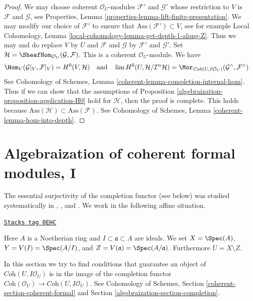 \begin{proof}

We may choose coherent $\mathcal{O}_U$-modules
$\mathcal{F}'$ and $\mathcal{G}'$ whose restriction to $V$
is $\mathcal{F}$ and $\mathcal{G}$, see
Properties, Lemma \ref{properties-lemma-lift-finite-presentation}.
We may modify our choice of $\mathcal{F}'$ to ensure that
$\text{Ass}(\mathcal{F}') \subset V$, see for example
Local Cohomology, Lemma \ref{local-cohomology-lemma-get-depth-1-along-Z}.
Thus we may and do replace $V$ by $U$ and $\mathcal{F}$ and $\mathcal{G}$
by $\mathcal{F}'$ and $\mathcal{G}'$.
Set $\mathcal{H} = \SheafHom_{\mathcal{O}_U}(\mathcal{G}, \mathcal{F})$.
This is a coherent $\mathcal{O}_U$-module. We have
$$
\Hom_V(\mathcal{G}|_V, \mathcal{F}|_V) =
H^0(V, \mathcal{H})
\quad\text{and}\quad
\lim H^0(U, \mathcal{H}/\mathcal{I}^n\mathcal{H}) =
\Mor_{\textit{Coh}(U, I\mathcal{O}_U)}
(\mathcal{G}^\wedge, \mathcal{F}^\wedge)
$$
See Cohomology of Schemes, Lemma \ref{coherent-lemma-completion-internal-hom}.
Thus if we can show that the assumptions of
Proposition \ref{algebraization-proposition-application-H0}
hold for $\mathcal{H}$, then the proof is complete.
This holds because
$\text{Ass}(\mathcal{H}) \subset \text{Ass}(\mathcal{F})$.
See Cohomology of Schemes, Lemma
\ref{coherent-lemma-hom-into-depth}.
\end{proof}

\section{Algebraization of coherent formal modules, I}
\label{algebraization-section-algebraization-modules}
The essential surjectivity of the completion functor (see below)
was studied systematically in
\cite{SGA2}, \cite{MRaynaud-book}, and \cite{MRaynaud-paper}.
We work in the following affine situation.

\begin{definition}
\label{algebraization-situation-algebraize}
\href{https://stacks.math.columbia.edu/tag/0EHC}{\texttt{Stacks tag 0EHC}}

Here $A$ is a Noetherian ring and $I \subset \mathfrak a \subset A$ are ideals.
We set $X = \Spec(A)$, $Y = V(I) = \Spec(A/I)$, and
$Z = V(\mathfrak a) = \Spec(A/\mathfrak a)$. Furthermore $U = X \setminus Z$.
\end{definition}

In this section we try to find conditions that guarantee an object
of $\textit{Coh}(U, I\mathcal{O}_U)$ is in the image of the completion functor
$\textit{Coh}(\mathcal{O}_U) \to \textit{Coh}(U, I\mathcal{O}_U)$.
See Cohomology of Schemes, Section \ref{coherent-section-coherent-formal} and
Section \ref{algebraization-section-completion}.

